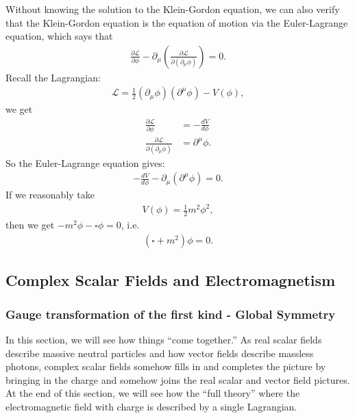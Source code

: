 \documentclass[a4paper,11pt]{article}
\numberwithin{equation}{section}
\theoremstyle{definition}
\newcommand{\p}{\partial}
\newcommand{\lag}{\mathcal{L}}
\begin{document}
Without knowing the solution to the Klein-Gordon equation, we can also verify that the Klein-Gordon equation is the equation of motion via the Euler-Lagrange equation, which says that
\begin{align}
\frac{\p \lag}{\p \phi} - \p_\mu\left( \frac{\p \lag}{\p(\p_\mu \phi)} \right) = 0.
\end{align}
Recall the Lagrangian:
\begin{align}
\lag = \frac{1}{2}(\p_\mu\phi)(\p^\mu\phi) - V(\phi),
\end{align}
we get
\begin{align}
\frac{\p\lag}{\p\phi} &= -\frac{dV}{d\phi}\\
\frac{\p\lag}{\p(\p_\mu\phi)} &= \p^\mu\phi.
\end{align}
So the Euler-Lagrange equation gives:
\begin{align}
-\frac{dV}{d\phi} - \p_\mu(\p^\mu\phi) = 0.
\end{align}
If we reasonably take
\begin{align}
V(\phi) = \frac{1}{2}m^2\phi^2,
\end{align}
then we get $-m^2\phi - \square \phi = 0$, i.e.
\begin{align}
(\square + m^2)\phi = 0.
\end{align}



\subsection{Complex Scalar Fields and Electromagnetism}
\subsubsection{Gauge transformation of the first kind - Global Symmetry}
In this section, we will see how things ``come together.'' As real scalar fields describe massive neutral particles and how vector fields describe massless photons, complex scalar fields somehow fills in and completes the picture by bringing in the charge and somehow joins the real scalar and vector field pictures. At the end of this section, we will see how the ``full theory'' where the electromagnetic field with charge is described by a single Lagrangian. \\
\end{document}
